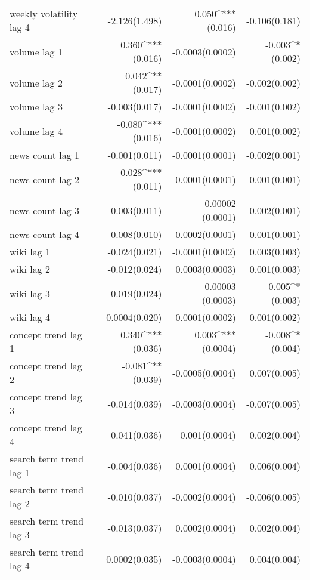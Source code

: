 \begin{table}[!htbp]
\begin{tabular}{@{\extracolsep{5pt}}lD{.}{.}{-3} D{.}{.}{-3} D{.}{.}{-3} }
  weekly volatility lag 4 & -2.126$ $(1.498) & 0.050^{***}$ $(0.016) & -0.106$ $(0.181) \\ 
  volume lag 1 & 0.360^{***}$ $(0.016) & -0.0003$ $(0.0002) & -0.003^{*}$ $(0.002) \\ 
  volume lag 2 & 0.042^{**}$ $(0.017) & -0.0001$ $(0.0002) & -0.002$ $(0.002) \\ 
  volume lag 3 & -0.003$ $(0.017) & -0.0001$ $(0.0002) & -0.001$ $(0.002) \\ 
  volume lag 4 & -0.080^{***}$ $(0.016) & -0.0001$ $(0.0002) & 0.001$ $(0.002) \\ 
  news count lag 1 & -0.001$ $(0.011) & -0.0001$ $(0.0001) & -0.002$ $(0.001) \\ 
  news count lag 2 & -0.028^{***}$ $(0.011) & -0.0001$ $(0.0001) & -0.001$ $(0.001) \\ 
  news count lag 3 & -0.003$ $(0.011) & 0.00002$ $(0.0001) & 0.002$ $(0.001) \\ 
  news count lag 4 & 0.008$ $(0.010) & -0.0002$ $(0.0001) & -0.001$ $(0.001) \\ 
  wiki lag 1 & -0.024$ $(0.021) & -0.0001$ $(0.0002) & 0.003$ $(0.003) \\ 
  wiki lag 2 & -0.012$ $(0.024) & 0.0003$ $(0.0003) & 0.001$ $(0.003) \\ 
  wiki lag 3 & 0.019$ $(0.024) & 0.00003$ $(0.0003) & -0.005^{*}$ $(0.003) \\ 
  wiki lag 4 & 0.0004$ $(0.020) & 0.0001$ $(0.0002) & 0.001$ $(0.002) \\ 
  concept trend lag 1 & 0.340^{***}$ $(0.036) & 0.003^{***}$ $(0.0004) & -0.008^{*}$ $(0.004) \\ 
  concept trend lag 2 & -0.081^{**}$ $(0.039) & -0.0005$ $(0.0004) & 0.007$ $(0.005) \\ 
  concept trend lag 3 & -0.014$ $(0.039) & -0.0003$ $(0.0004) & -0.007$ $(0.005) \\ 
  concept trend lag 4 & 0.041$ $(0.036) & 0.001$ $(0.0004) & 0.002$ $(0.004) \\ 
  search term trend lag 1 & -0.004$ $(0.036) & 0.0001$ $(0.0004) & 0.006$ $(0.004) \\ 
  search term trend lag 2 & -0.010$ $(0.037) & -0.0002$ $(0.0004) & -0.006$ $(0.005) \\ 
  search term trend lag 3 & -0.013$ $(0.037) & 0.0002$ $(0.0004) & 0.002$ $(0.004) \\ 
  search term trend lag 4 & 0.0002$ $(0.035) & -0.0003$ $(0.0004) & 0.004$ $(0.004) \\ 

\end{tabular}
\end{table}
